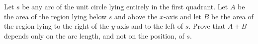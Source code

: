 Let $s$ be any arc of the unit circle lying entirely in the first
quadrant.  Let $A$ be the area of the region lying below $s$ and
above the $x$-axis and let $B$ be the area of the region lying to the
right of the $y$-axis and to the left of $s$.  Prove that $A+B$ depends
only on the arc length, and not on the position, of $s$.
